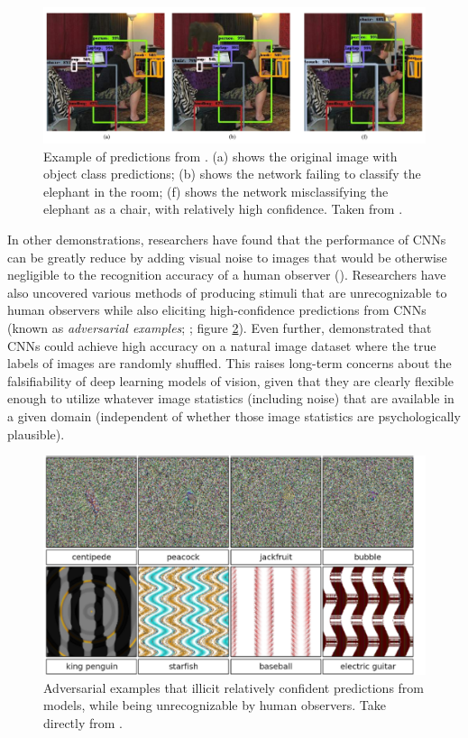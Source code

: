 \documentclass[12pt]{article}
\let\oldcite=\cite
\let\oldtextcite=\textcite
\renewcommand{\cite}[1]{\textcolor[rgb]{0, .121, .388}{\oldcite{#1}}}
\renewcommand{\textcite}[1]{\textcolor[rgb]{0, .121, .388}{\oldtextcite{#1}}}
\begin{document}
\begin{figure}[!h]
    \centering
    \includegraphics[scale=.4]{figures/rosenfeld2018elephant.png}
    \caption{Example of predictions from \textcite{rosenfeld2018elephant}. (a) shows the original image with object class predictions; (b) shows the network failing to classify the elephant in the room; (f) shows the network misclassifying the elephant as a chair, with relatively high confidence. Taken from \textcite{rosenfeld2018elephant}.}
    \label{fig:rosenfeld2018elephant}
\end{figure} 

In other demonstrations, researchers have found that the performance of CNNs can be greatly reduce by adding visual noise to images that would be otherwise negligible to the recognition accuracy of a human observer (\cite{jo2017measuring,geirhos2018imagenet}). Researchers have also uncovered various methods of producing stimuli that are unrecognizable to human observers while also eliciting high-confidence predictions from CNNs (known as \emph{adversarial examples}; \cite{nguyen2015deep,szegedy2013intriguing,goodfellow2014explaining}; figure \ref{fig:advEx}). Even further, \textcite{zhang2016understanding} demonstrated that CNNs could achieve high accuracy on a natural image dataset where the true labels of images are randomly shuffled. This raises long-term concerns about the falsifiability of deep learning models of vision, given that they are clearly flexible enough to utilize whatever image statistics (including noise) that are available in a given domain (independent of whether those image statistics are psychologically plausible). 

\begin{figure}[!h]
    \centering
    \includegraphics[scale=.4]{figures/advEx.png}
    \caption{Adversarial examples that illicit relatively confident predictions from models, while being unrecognizable by human observers. Take directly from \cite{nguyen2015deep}.}
    \label{fig:advEx}
\end{figure} 
\end{document}

